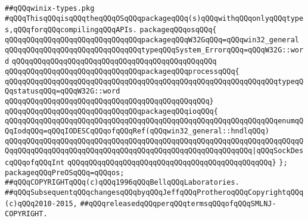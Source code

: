 \label{src/lib/std/src/win32/winix-types.pkg}
\verb|##qQQqwinix-types.pkg|\newline
\newline
\newline
\verb|#qQQqThisqQQqisqQQqtheqQQqOSqQQqpackageqQQq(s)qQQqwithqQQqonlyqQQqtypes,qQQqforqQQqcompilingqQQqAPIs.|\newline
\newline
\newline
\newline
\verb|packageqQQqosqQQq{|\newline
\newline
\verb|qQQqqQQqqQQqqQQqqQQqqQQqqQQqqQQqpackageqQQqW32GqQQq=qQQqwin32_general|\newline
\newline
\verb|qQQqqQQqqQQqqQQqqQQqqQQqqQQqqQQqtypeqQQqSystem_ErrorqQQq=qQQqW32G::word|\newline
\verb|qQQqqQQqqQQqqQQqqQQqqQQqqQQqqQQqqQQqqQQqqQQqqQQq|\newline
\verb|qQQqqQQqqQQqqQQqqQQqqQQqqQQqqQQqpackageqQQqprocessqQQq{|\newline
\newline
\verb|qQQqqQQqqQQqqQQqqQQqqQQqqQQqqQQqqQQqqQQqqQQqqQQqqQQqqQQqqQQqqQQqtypeqQQqstatusqQQq=qQQqW32G::word|\newline
\verb|qQQqqQQqqQQqqQQqqQQqqQQqqQQqqQQqqQQqqQQqqQQqqQQq}|\newline
\newline
\verb|qQQqqQQqqQQqqQQqqQQqqQQqqQQqqQQqpackageqQQqioqQQq{|\newline
\newline
\verb|qQQqqQQqqQQqqQQqqQQqqQQqqQQqqQQqqQQqqQQqqQQqqQQqqQQqqQQqqQQqqQQqenumqQQqIodqQQq=qQQqIODESCqQQqofqQQqRef(qQQqwin32_general::hndlqQQq)|\newline
\verb|qQQqqQQqqQQqqQQqqQQqqQQqqQQqqQQqqQQqqQQqqQQqqQQqqQQqqQQqqQQqqQQqqQQqqQQqqQQqqQQqqQQqqQQqqQQqqQQqqQQqqQQqqQQqqQQqqQQqqQQqqQQqqQQq|\verb#|qQQqSockDescqQQqofqQQqInt#\newline
\verb|qQQqqQQqqQQqqQQqqQQqqQQqqQQqqQQqqQQqqQQqqQQqqQQq}|\newline
\verb|};|\newline
\newline
\verb|packageqQQqPreOSqQQq=qQQqos;|\newline
\newline
\newline
\newline
\verb|##qQQqCOPYRIGHTqQQq(c)qQQq1996qQQqBellqQQqLaboratories.|\newline
\verb|##qQQqSubsequentqQQqchangesqQQqbyqQQqJeffqQQqProtheroqQQqCopyrightqQQq(c)qQQq2010-2015,|\newline
\verb|##qQQqreleasedqQQqperqQQqtermsqQQqofqQQqSMLNJ-COPYRIGHT.|\newline

